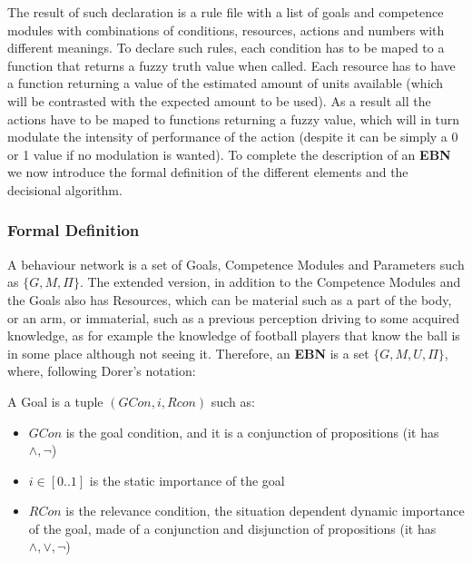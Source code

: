 \documentclass[
		twoside,openright,titlepage,numbers=noenddot,manychapters,
		headinclude,%
                footinclude=false,cleardoublepage=empty,
                BCOR=5mm,
		fontsize=11pt, %
                 enabledeprecatedfontcommands]{scrreprt}
\begin{document}
The result of such declaration is a rule file with a list of goals and competence modules with combinations of conditions, resources, actions and numbers with different meanings. To declare such rules, each condition has to be maped to a function that returns a fuzzy truth value when called. Each resource has to have a function returning a value of the estimated amount of units available (which will be contrasted with the expected amount to be used). As a result all the actions have to be maped to functions returning a fuzzy value, which will in turn modulate the intensity of performance of the action (despite it can be simply a 0 or 1 value if no modulation is wanted).
To complete the description of an \textbf{EBN} we now introduce the formal definition of the different elements and the decisional algorithm.



\subsubsection{Formal Definition}
\label{EBNdef}
A behaviour network is a set of Goals, Competence Modules and Parameters such as $\{G,M,\Pi\}$. The extended version, in addition to the Competence Modules and the Goals also has Resources, which can be material such as a part of the body, or an arm, or immaterial, such as a previous perception driving to some acquired knowledge, as for example the knowledge of football players that know the ball is in some place although not seeing it. Therefore, an \textbf{EBN} is a set $\{G,M,U,\Pi\}$, where, following Dorer's notation:

A Goal is a tuple $ (GCon,i,Rcon )$  such as:
\begin{itemize}
\item $GCon$ is the goal condition, and it is a conjunction of propositions (it has $\wedge, \neg $)
\item $i \in [0..1]$ is the static importance of the goal
\item $RCon$ is the relevance condition, the situation dependent dynamic importance of the goal, made of a conjunction and disjunction of propositions (it has $\wedge, \vee, \neg $)
\end{itemize}
\end{document}
